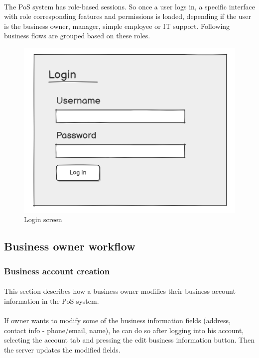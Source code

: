 \documentclass{article}
\begin{document}
    \paragraph{}The PoS system has role-based sessions. So once a user logs in, a specific interface with role corresponding features and permissions is loaded, depending if the user is the business owner, manager, simple employee or IT support. Following business flows are grouped based on these roles.
     \begin{figure}[H]
        \centering
        \includegraphics[width=0.9\linewidth]{PSP/lab-1/mockups/login.png}
        \caption{Login screen}
        \label{}
    \end{figure}
    
    \subsection{Business owner workflow}
    \subsubsection{Business account creation}
    \paragraph{}This section describes how a business owner modifies their business account information in the PoS system.
     \paragraph{}If owner wants to modify some of the business information fields (address, contact info - phone/email, name), he can do so after logging into his account, selecting the account tab and pressing the edit business information button. Then the server updates the modified fields.
    
\end{document}
